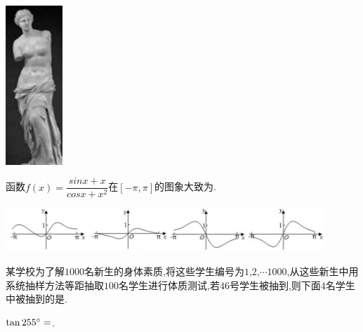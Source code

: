 \documentclass[windows,list]{BHCexam}
\begin{document}
\begin{groups}
\begin{questions}[]
\begin{minipage}{\linewidth}

\begin{center}
	\includegraphics[height=6cm]{./sSFh6W64bKcV715x2rYUVGCnqVea4NCO.png}
	\vspace{0.5cm}
\end{center}
\begin{solution}{4cm}

\end{solution}
\end{minipage}
\vfill
\begin{minipage}{\linewidth}
\question[5] 函数$f(x)= \dfrac {sinx+x}{cosx+x^{2}}$在$[- \pi  ,  \pi ]$的图象大致为.
\begin{center}
\includegraphics[width=12cm]{./F7UJfg6iYCiCefLftREhksYit6NP46Of.png}
\vspace{0.5cm}
\end{center}
\begin{solution}{4cm}

\end{solution}
\end{minipage}
\vfill
\begin{minipage}{\linewidth}
\question[5] 某学校为了解$1000$名新生的身体素质,将这些学生编号为$1$,$2$,$ \cdots 1000$,从这些新生中用系统抽样方法等距抽取$100$名学生进行体质测试,若$46$号学生被抽到,则下面$4$名学生中被抽到的是.


\begin{solution}{4cm}

\end{solution}
\end{minipage}
\vfill
\begin{minipage}{\linewidth}
\question[5] $\tan255^{\small \circ}=$.
\begin{solution}{4cm}


\end{solution}
\end{minipage}
\end{questions}
\end{groups}
\end{document}
